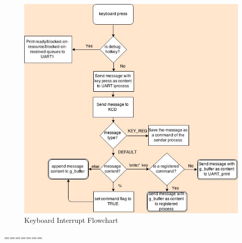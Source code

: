 \documentclass[11pt, oneside]{article}
\begin{document}
\begin{figure}[ht!]
\centering
\includegraphics[width=150mm]{Keyboard_interrupt.jpg}
\caption{Keyboard Interrupt Flowchart \label{overflow}}
\end{figure}
=======
\end{document}
